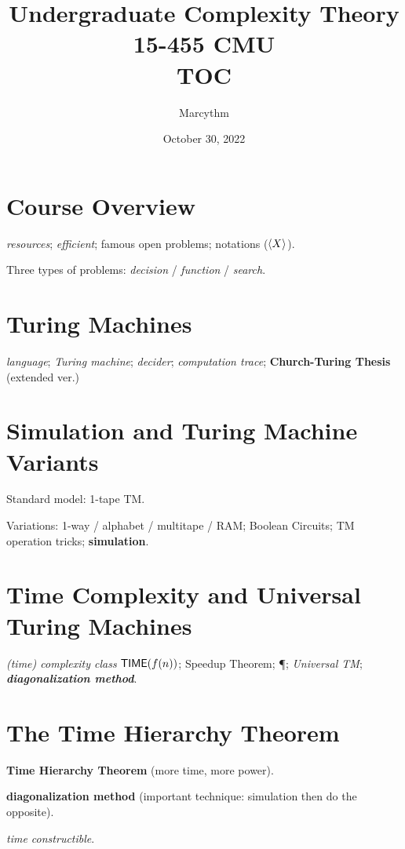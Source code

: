 \documentclass{article}
\title{Undergraduate Complexity Theory 15-455 \@@ CMU \\ TOC}
\author{Marcythm}
\date{October 30, 2022}
\begin{document}
\maketitle{}

\section{Course Overview}

\textit{resources};
\textit{efficient};
famous open problems;
notations ($\left\langle X \right\rangle$).
\par
Three types of problems: \textit{decision} / \textit{function} / \textit{search}.


\section{Turing Machines}

\textit{language};
\textit{Turing machine};
\textit{decider};
\textit{computation trace};
\textbf{Church-Turing Thesis} (extended ver.)


\section{Simulation and Turing Machine Variants}

Standard model: 1-tape TM.
\par
Variations: 1-way / alphabet / multitape / RAM;
Boolean Circuits;
TM operation tricks;
\textbf{simulation}.


\section{Time Complexity and Universal Turing Machines}

\textit{(time) complexity class} $\text{\sf TIME}(f(n))$;
Speedup Theorem;
\P;
\textit{Universal TM};
\textit{\textbf{diagonalization method}}.


\section{The Time Hierarchy Theorem}

\textbf{Time Hierarchy Theorem} (more time, more power).
\par
\textbf{diagonalization method} (important technique: simulation then do the opposite).
\par
\textit{time constructible}.
\end{document}
